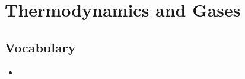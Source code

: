 \section{Thermodynamics and Gases}

\subsection{Vocabulary}
\begin{itemize}
    \item 
\end{itemize}

